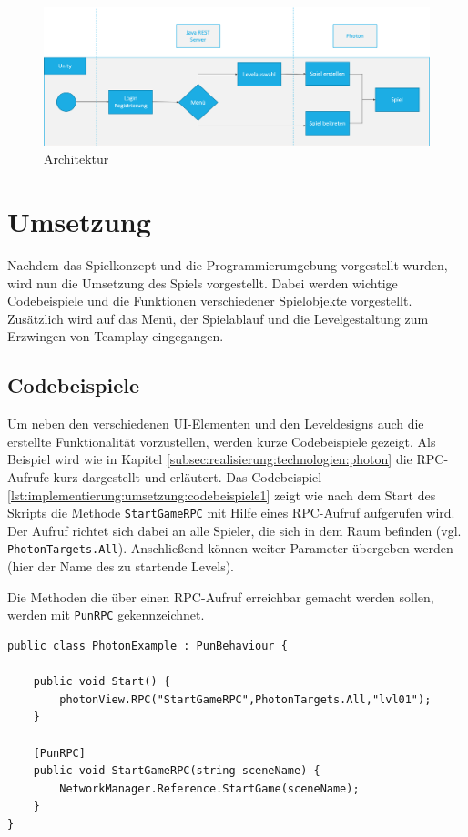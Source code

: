 \begin{figure}[H]
    \begin{center}
      \includegraphics[width=\linewidth]{img/realisierung/Architektur2}
      \caption{Architektur}
      \label{fig:realisierung:technologien:architektur}
    \end{center}
\end{figure}

\section{Umsetzung}
\label{sec:grundlagen:umsetzung}
Nachdem das Spielkonzept und die Programmierumgebung vorgestellt wurden, wird nun die Umsetzung des Spiels vorgestellt. Dabei werden wichtige Codebeispiele und die Funktionen verschiedener Spielobjekte vorgestellt. Zusätzlich wird auf das Menü, der Spielablauf und die Levelgestaltung zum Erzwingen von Teamplay eingegangen.

\subsection{Codebeispiele}
\label{subsec:implementierung:umsetzung:codebeispiele}
Um neben den verschiedenen UI-Elementen und den Leveldesigns auch die erstellte Funktionalität vorzustellen, werden kurze Codebeispiele gezeigt. Als Beispiel wird wie in Kapitel \ref{subsec:realisierung:technologien:photon} die RPC-Aufrufe kurz dargestellt und erläutert. Das Codebeispiel \ref{lst:implementierung:umsetzung:codebeispiele1} zeigt wie nach dem Start des Skripts die Methode \texttt{StartGameRPC} mit Hilfe eines RPC-Aufruf aufgerufen wird. Der Aufruf richtet sich dabei an alle Spieler, die sich in dem Raum befinden (vgl. \texttt{PhotonTargets.All}). Anschließend können weiter Parameter übergeben werden (hier der Name des zu startende Levels).

Die Methoden die über einen RPC-Aufruf erreichbar gemacht werden sollen, werden mit \texttt{PunRPC} gekennzeichnet.

\begin{lstlisting}[caption={RPC-Aufrufe}, label=lst:implementierung:umsetzung:codebeispiele1]
public class PhotonExample : PunBehaviour {

    public void Start() {        
        photonView.RPC("StartGameRPC",PhotonTargets.All,"lvl01");    
    }
    
    [PunRPC]    
    public void StartGameRPC(string sceneName) {        
        NetworkManager.Reference.StartGame(sceneName);    
    }
}
\end{lstlisting}

